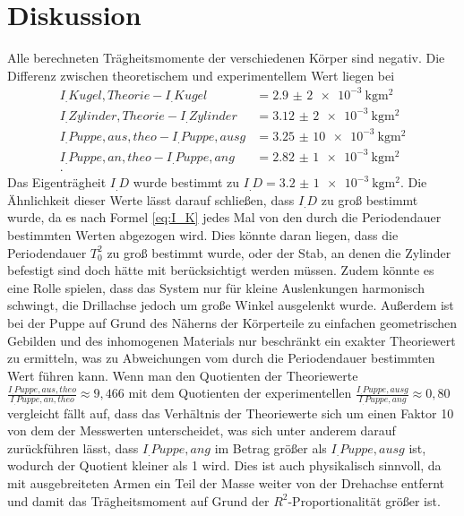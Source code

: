 \section{Diskussion}
\label{sec:Diskussion}
Alle berechneten Trägheitsmomente der verschiedenen Körper sind negativ.
Die Differenz zwischen theoretischem und experimentellem Wert liegen bei
\begin{align*}
I_.{Kugel,Theorie}-I_.{Kugel}		&=\SI{2,9(2)e-3}{\kilo\gram\metre\squared}\\
I_.{Zylinder,Theorie}-I_.{Zylinder}	&=\SI{3,12(2)e-3}{\kilo\gram\metre\squared}\\
I_.{Puppe,aus,theo}-I_.{Puppe,ausg}	&=\SI{3,25(10)e-3}{\kilo\gram\metre\squared}\\
I_.{Puppe,an,theo}-I_.{Puppe,ang}	&=\SI{2,82(1)e-3}{\kilo\gram\metre\squared}\\\text{.}
\end{align*}
Das Eigenträgheit $I_.D$ wurde bestimmt zu $I_.D=\SI{3,2(1)e-3}{\kilo\gram\metre\squared}$.
Die Ähnlichkeit dieser Werte lässt darauf schließen, dass $I_.D$ zu groß bestimmt wurde, da es nach Formel \eqref{eq:I_K} jedes Mal von den durch die Periodendauer bestimmten Werten abgezogen wird.\newline
Dies könnte daran liegen, dass die Periodendauer $T_0^2$ zu groß bestimmt wurde, oder der Stab, an denen die Zylinder befestigt sind doch hätte mit berücksichtigt werden müssen. Zudem könnte es eine Rolle spielen, dass das System nur für kleine Auslenkungen harmonisch schwingt, die Drillachse jedoch um große Winkel ausgelenkt wurde.\newline
Außerdem ist bei der Puppe auf Grund des Näherns der Körperteile zu einfachen geometrischen Gebilden und des inhomogenen Materials nur beschränkt ein exakter Theoriewert zu ermitteln, was zu Abweichungen vom durch die Periodendauer bestimmten Wert führen kann.
Wenn man den Quotienten der Theoriewerte $\frac{I_.{Puppe,aus,theo}}{I_.{Puppe,an,theo}}\approx 9,466$
mit dem Quotienten der experimentellen $\frac{I_.{Puppe,ausg}}{I_.{Puppe,ang}}\approx 0,80$
vergleicht fällt auf, dass das Verhältnis der Theoriewerte sich um einen Faktor 10 von dem der Messwerten unterscheidet, was sich unter anderem darauf zurückführen lässt, dass $I_.{Puppe,ang}$ im Betrag größer als $I_.{Puppe,ausg}$ ist, wodurch der Quotient kleiner als 1 wird. Dies ist auch physikalisch sinnvoll, da mit ausgebreiteten Armen ein Teil der Masse weiter von der Drehachse entfernt und damit das Trägheitsmoment auf Grund der $R^2$-Proportionalität größer ist.